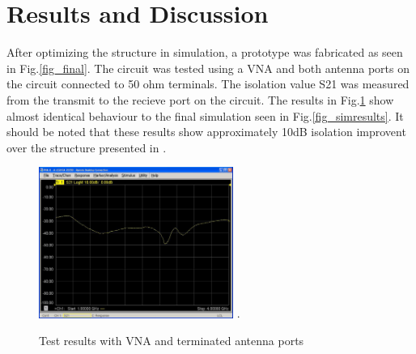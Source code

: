 
\section{Results and Discussion}
After optimizing the structure in simulation, a prototype was fabricated as seen in Fig.\ref{fig_final}. The circuit was tested using a VNA and both antenna ports on the circuit connected to 50 ohm terminals. The isolation value S21 was measured from the transmit to the recieve port on the circuit. The results in Fig.\ref{fig_results}  show almost identical behaviour to the final simulation seen in  Fig.\ref{fig_simresults}. It should be noted that these results show approximately 10dB isolation improvent over the structure presented in  \cite{chiu_compact_2013}.

 \begin{figure}[!t]
\centering
\includegraphics[width=2.5in]{results.jpg}
\DeclareGraphicsExtensions.
\caption{Test results with VNA and terminated antenna ports}
\label{fig_results}
\end{figure} 

%
%

